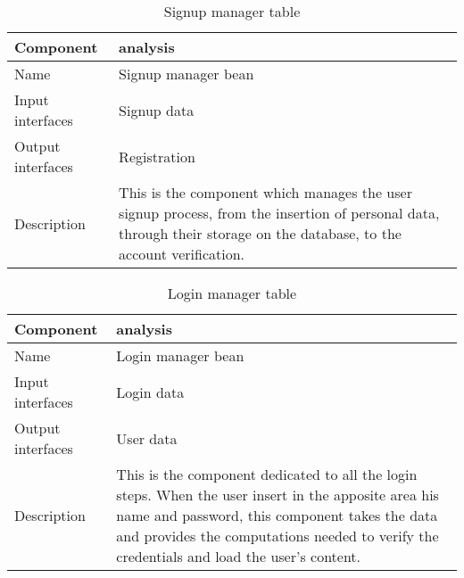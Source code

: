 \begin{flushleft}
	
	\begin{table}[htp]
		
		\begin{tabular}{l|l}
			Component&analysis\\
			\hline
			\hline
			Name&Signup manager bean\\
			\hline
			Input interfaces& Signup data \\
			\hline
			Output interfaces& Registration\\
			\hline
			Description&This is the component which manages the user signup process, from the insertion of personal data, through their storage on the database, to the account verification. \\
			\hline
			
		\end{tabular}
		
		\caption{Signup manager table } 
		\label{tab:signupmanagertable}
		
	\end{table}
	
\end{flushleft}

\begin{flushleft}
	
	\begin{table}[htp]
		
		\begin{tabular}{l|l}
			Component&analysis\\
			\hline
			\hline
			Name&Login manager bean\\
			\hline
			Input interfaces& Login data \\
			\hline
			Output interfaces& User data \\
			\hline
			Description&This is the component dedicated to all the login steps. When the user insert in the apposite area his name and password, this component takes the data and provides the computations needed to verify the credentials and load the user's content. \\
			\hline
			
		\end{tabular}
		
		\caption{Login manager table } 
		\label{tab:loginmanagertable}
		
	\end{table}
	
\end{flushleft}

